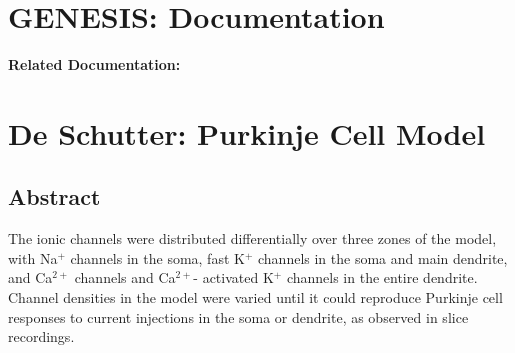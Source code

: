 \documentclass[12pt]{article}
\begin{document}
\section*{GENESIS: Documentation}

{\bf Related Documentation:}

\section*{De Schutter: Purkinje Cell Model}

\subsection*{Abstract}

The ionic channels were distributed differentially over three
zones of the model, with Na$^+$ channels in the soma, fast K$^+$ channels
in the soma and main dendrite, and Ca$^{2+}$ channels and Ca$^{2+}$-
activated K$^+$ channels in the entire dendrite. Channel densities in
the model were varied until it could reproduce Purkinje cell responses
to current injections in the soma or dendrite, as observed
in slice recordings.
\end{document}
